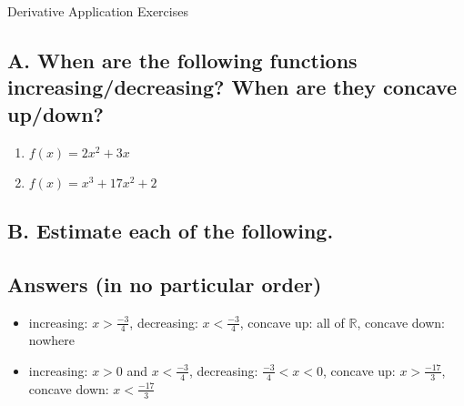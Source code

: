 \documentclass{article}
\newcommand{\R}{\mathbb{R}}
\begin{document}
\begin{center}
\begin{Huge}Derivative Application Exercises\end{Huge}
\end{center}


\subsection*{A. When are the following functions increasing/decreasing? When are they concave up/down?}

\begin{enumerate}
\item $f(x)=2x^2+3x$
\item $f(x)=x^3+17x^2+2$
\end{enumerate}

\subsection*{B. Estimate each of the following.}



\newpage



\subsection*{Answers (in no particular order)}

\begin{itemize}
\item increasing: $x>\frac{-3}{4}$, decreasing: $x<\frac{-3}{4}$, concave up: all of $\R$, concave down: nowhere
\item increasing: $x>0$ and $x<\frac{-3}{4}$, decreasing: $\frac{-3}{4}<x<0$, concave up: $x>\frac{-17}{3}$, concave down: $x<\frac{-17}{3}$
\end{itemize}
\end{document}
